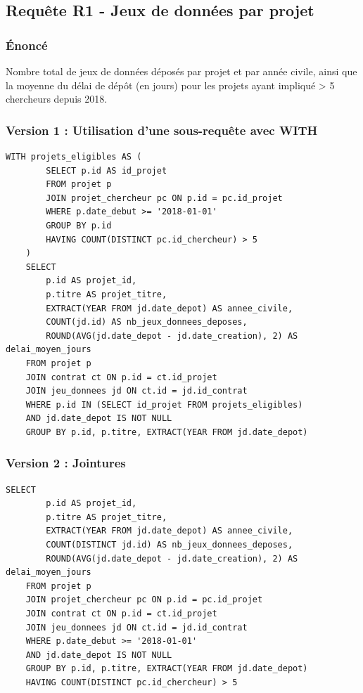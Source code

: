\documentclass[12pt,a4paper]{article}
\begin{document}
\subsection{Requête R1 - Jeux de données par projet}

\subsubsection{Énoncé}
Nombre total de jeux de données déposés par projet et par année civile, ainsi que la moyenne du délai de dépôt (en jours) pour les projets ayant impliqué > 5 chercheurs depuis 2018.

\subsubsection{Version 1 : Utilisation d'une sous-requête avec WITH}
\begin{lstlisting}[style=sqlstyle, caption=R1 - Version 1]
    WITH projets_eligibles AS (
        SELECT p.id AS id_projet
        FROM projet p
        JOIN projet_chercheur pc ON p.id = pc.id_projet
        WHERE p.date_debut >= '2018-01-01'
        GROUP BY p.id
        HAVING COUNT(DISTINCT pc.id_chercheur) > 5
    )
    SELECT 
        p.id AS projet_id,
        p.titre AS projet_titre,
        EXTRACT(YEAR FROM jd.date_depot) AS annee_civile,
        COUNT(jd.id) AS nb_jeux_donnees_deposes,
        ROUND(AVG(jd.date_depot - jd.date_creation), 2) AS delai_moyen_jours
    FROM projet p
    JOIN contrat ct ON p.id = ct.id_projet
    JOIN jeu_donnees jd ON ct.id = jd.id_contrat
    WHERE p.id IN (SELECT id_projet FROM projets_eligibles)
    AND jd.date_depot IS NOT NULL
    GROUP BY p.id, p.titre, EXTRACT(YEAR FROM jd.date_depot)
\end{lstlisting}

\subsubsection{Version 2 : Jointures}
\begin{lstlisting}[style=sqlstyle, caption=R1 - Version 2]
    SELECT 
        p.id AS projet_id,
        p.titre AS projet_titre,
        EXTRACT(YEAR FROM jd.date_depot) AS annee_civile,
        COUNT(DISTINCT jd.id) AS nb_jeux_donnees_deposes,
        ROUND(AVG(jd.date_depot - jd.date_creation), 2) AS delai_moyen_jours
    FROM projet p
    JOIN projet_chercheur pc ON p.id = pc.id_projet
    JOIN contrat ct ON p.id = ct.id_projet
    JOIN jeu_donnees jd ON ct.id = jd.id_contrat
    WHERE p.date_debut >= '2018-01-01'
    AND jd.date_depot IS NOT NULL
    GROUP BY p.id, p.titre, EXTRACT(YEAR FROM jd.date_depot)
    HAVING COUNT(DISTINCT pc.id_chercheur) > 5
\end{lstlisting}
\end{document}

